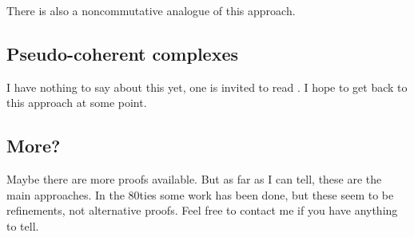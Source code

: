 \documentclass[10pt,a4paper]{article}
\begin{document}
There is also a noncommutative analogue of this approach.

\subsection{Pseudo-coherent complexes}
\label{subsection:lipman}
I have nothing to say about this yet, one is invited to read \cite{lipman-notes-on-grothendieck-duality}. I hope to get back to this approach at some point.

\subsection{More?}
Maybe there are more proofs available. But as far as I can tell, these are the main approaches. In the 80ties some work has been done, but these seem to be refinements, not alternative proofs. Feel free to contact me if you have anything to tell.


\printbibliography
\end{document}
